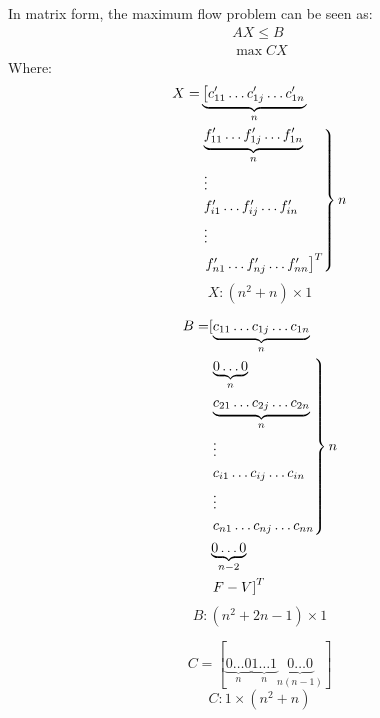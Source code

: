 In matrix form, the maximum flow problem can be seen as:
\begin{equation*}
\begin{gathered}
  AX \leq B \\
  \max{CX}
\end{gathered}
\end{equation*}
Where:
\begin{align*}
  X = &\underbrace{\left[c'_{11} \dots c'_{1j} \dots c'_{1n} \right.}_{n} \\
    &\begin{rcases}
      \underbrace{f'_{11} \dots f'_{1j} \dots f'_{1n}}_{n} \\
      \vdots \\
      f'_{i1} \dots f'_{ij} \dots f'_{in} \\
      \vdots \\
      \left. f'_{n1} \dots f'_{nj} \dots f'_{nn} \right]^T
    \end{rcases} n
\end{align*}
\begin{equation*}
  X : \left(n^2 + n\right) \times 1
\end{equation*}

\begin{align*}
  B = &[\underbrace{c_{11} \dots c_{1j} \dots c_{1n}}_{n} \\
    &\begin{rcases}
      \underbrace{0 \dots 0}_{n} \\
      \underbrace{c_{21} \dots c_{2j} \dots c_{2n}}_{n} \\
      \vdots \\
      c_{i1} \dots c_{ij} \dots c_{in} \\
      \vdots \\
      c_{n1} \dots c_{nj} \dots c_{nn}
    \end{rcases} n \\
    &\underbrace{0 \dots 0}_{n-2} \\
    &\left. F - V \right]^T
\end{align*}
\begin{equation*}
  B : \left(n^2 + 2n - 1\right) \times 1
\end{equation*}

\begin{equation*}
  C = [\underbrace{0 \dots 0}_{n}
      \underbrace{1 \dots 1}_{n}
      \underbrace{0 \dots 0}_{n\left(n - 1\right)}]
\end{equation*}
\begin{equation*}
  C : 1 \times \left(n^2 + n\right)
\end{equation*}

